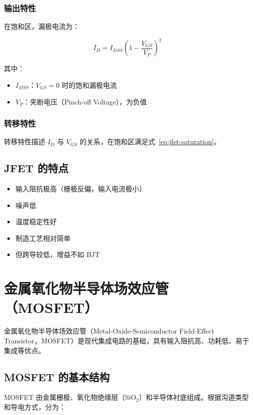 \subsubsection{输出特性}

在饱和区，漏极电流为：

\begin{equation}
I_D = I_{DSS} \left(1 - \frac{V_{GS}}{V_P}\right)^2 \label{eq:jfet-saturation}
\end{equation}

其中：
\begin{itemize}
  \item $I_{DSS}$：$V_{GS} = 0$ 时的饱和漏极电流
  \item $V_P$：夹断电压（Pinch-off Voltage），为负值
\end{itemize}

\subsubsection{转移特性}

转移特性描述 $I_D$ 与 $V_{GS}$ 的关系，在饱和区满足式~\ref{eq:jfet-saturation}。

\subsection{JFET 的特点}

\begin{itemize}
  \item 输入阻抗极高（栅极反偏，输入电流极小）
  \item 噪声低
  \item 温度稳定性好
  \item 制造工艺相对简单
  \item 但跨导较低，增益不如 BJT
\end{itemize}

\section{金属氧化物半导体场效应管（MOSFET）}

金属氧化物半导体场效应管（Metal-Oxide-Semiconductor Field-Effect Transistor，MOSFET）是现代集成电路的基础，具有输入阻抗高、功耗低、易于集成等优点。

\subsection{MOSFET 的基本结构}

MOSFET 由金属栅极、氧化物绝缘层（SiO$_2$）和半导体衬底组成。根据沟道类型和导电方式，分为：

